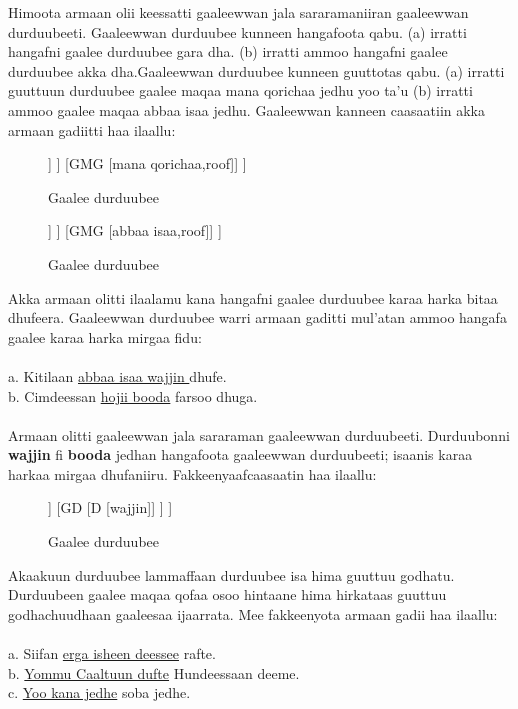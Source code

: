 \documentclass[11pt,b5paper]{book}
\begin{document}
Himoota armaan olii keessatti gaaleewwan jala sararamaniiran gaaleewwan durduubeeti. Gaaleewwan durduubee kunneen
hangafoota qabu. (a) irratti hangafni gaalee durduubee gara dha. (b) irratti ammoo hangafni gaalee durduubee akka dha.Gaaleewwan durduubee kunneen guuttotas qabu. (a) irratti guuttuun durduubee gaalee maqaa mana qorichaa jedhu yoo ta’u (b) irratti ammoo gaalee maqaa abbaa isaa jedhu. Gaaleewwan kanneen caasaatiin akka armaan gadiitti haa
ilaallu: 

\begin{figure}[H]										
	\caption{Gaalee durduubee}
	\centering
	\begin{forest}
		[GDG
			[GD
				[D [gara]]
			]
			[GMG [mana qorichaa,roof]]
		]
	\end{forest}
\end{figure}

\begin{figure}[H]										
	\caption{Gaalee durduubee}
	\centering
	\begin{forest}
		[GDG
			[GD
				[D [akka]]
			]
			[GMG [abbaa isaa,roof]]
		]
	\end{forest}
\end{figure}

Akka armaan olitti ilaalamu kana hangafni gaalee durduubee karaa harka bitaa dhufeera. Gaaleewwan durduubee warri
armaan gaditti mul’atan ammoo hangafa gaalee karaa harka mirgaa fidu: \\
\\
a. Kitilaan \underline{abbaa isaa wajjin }dhufe.\\
b. Cimdeessan \underline{hojii booda} farsoo dhuga.\\
\\

Armaan olitti gaaleewwan jala sararaman gaaleewwan durduubeeti. Durduubonni \textbf{wajjin} fi \textbf{booda} jedhan hangafoota gaaleewwan durduubeeti; isaanis karaa harkaa mirgaa dhufaniiru. Fakkeenyaafcaasaatin haa ilaallu:

\begin{figure}[H]										
	\caption{Gaalee durduubee}
	\centering
	\begin{forest}
		[GDG
			[GMG [abbaa isaa,roof]]
			[GD
				[D [wajjin]]
			]
		]
	\end{forest}
\end{figure}

Akaakuun durduubee lammaffaan durduubee isa hima guuttuu godhatu. Durduubeen gaalee maqaa qofaa osoo hintaane hima
hirkataas guuttuu godhachuudhaan gaaleesaa ijaarrata. Mee fakkeenyota armaan gadii haa ilaallu:\\
\\
a. Siifan \underline{erga isheen deessee} rafte.\\
b. \underline{Yommu Caaltuun dufte} Hundeessaan deeme.\\
c. \underline{Yoo kana jedhe} soba jedhe.\\
\end{document}

